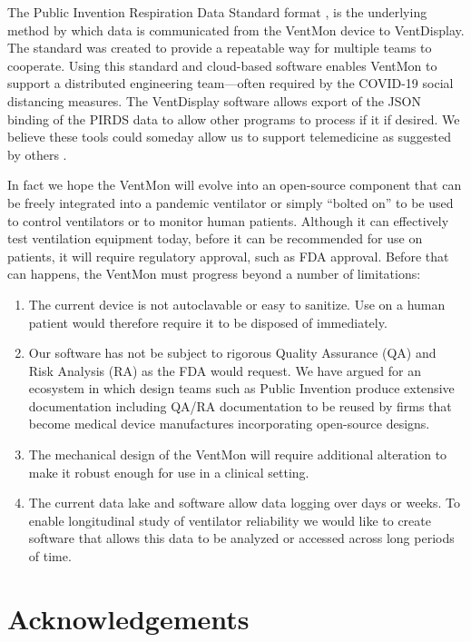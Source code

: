 \documentclass[11pt, letterpaper]{article}
\begin{document}
The Public Invention Respiration Data Standard format \cite{PIRDS}, is the underlying method by which data is communicated from the VentMon device to VentDisplay. The standard was created to provide a repeatable way for multiple teams to cooperate. Using this standard and cloud-based software enables VentMon to support a distributed engineering team---often required by the COVID-19 social distancing measures. The VentDisplay software allows export of the JSON binding of the PIRDS data to allow other programs to process if it if desired. We believe these tools could someday allow us to support telemedicine as suggested by others \cite{rehm2018development}.

In fact we hope the VentMon will evolve into an open-source component that can be freely integrated into a pandemic ventilator or simply ``bolted on'' to be used to control ventilators or to monitor human patients. Although it can effectively test ventilation equipment today, before it can be recommended for use on patients, it will require regulatory approval, such as FDA approval. Before that can happens, the VentMon must progress beyond a number of limitations:
\begin{enumerate}
\item The current device is not autoclavable or easy to sanitize. Use on a human patient would therefore require it to be disposed of immediately.
\item Our software has not be subject to rigorous Quality Assurance (QA) and Risk Analysis (RA) as the FDA would request. We have argued\cite{ecosystem} for an ecosystem in which design teams such as Public Invention produce extensive documentation including  QA/RA documentation to be reused by firms that become medical device manufactures incorporating open-source designs.
\item The mechanical design of the VentMon will require additional alteration to make it robust enough for use in a clinical setting.
\item The current data lake and software allow data  logging over days or weeks. To enable longitudinal study of ventilator reliability we would like to create software that allows this data to be analyzed or accessed across long periods of time.
\end{enumerate}



\section{Acknowledgements}
\end{document}
